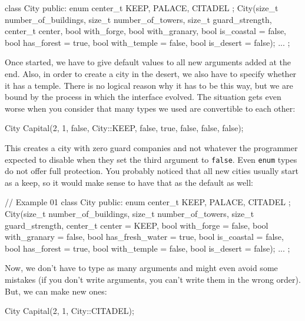 \begin{code}
class City {
  public:
  enum center_t { KEEP, PALACE, CITADEL };
  City(size_t number_of_buildings,
       size_t number_of_towers,
       size_t guard_strength,
       center_t center,
       bool with_forge,
       bool with_granary,
       bool is_coastal = false,
       bool has_forest = true,
       bool with_temple = false,
       bool is_desert = false);
  ...
};
\end{code}

Once started, we have to give default values to all new arguments added at the end. Also, in order to create a city in the desert, we also have to specify whether it has a temple. There is no logical reason why it has to be this way, but we are bound by the process in which the interface evolved. The situation gets even worse when you consider that many types we used are convertible to each other:

\begin{code}
City Capital(2, 1, false, City::KEEP,
             false, true, false, false, false);
\end{code}

This creates a city with zero guard companies and not whatever the programmer expected to disable when they set the third argument to \texttt{false}. Even \texttt{enum} types do not offer full protection. You probably noticed that all new cities usually start as a keep, so it would make sense to have that as the default as well:

\begin{code}
// Example 01
class City {
  public:
  enum center_t { KEEP, PALACE, CITADEL };
  City(size_t number_of_buildings,
       size_t number_of_towers,
       size_t guard_strength,
       center_t center = KEEP,
       bool with_forge = false,
       bool with_granary = false,
       bool has_fresh_water = true,
       bool is_coastal = false,
       bool has_forest = true,
       bool with_temple = false,
       bool is_desert = false);
  ...
};
\end{code}

Now, we don't have to type as many arguments and might even avoid some mistakes (if you don't write arguments, you can't write them in the wrong order). But, we can make new ones:

\begin{code}
City Capital(2, 1, City::CITADEL);
\end{code}

